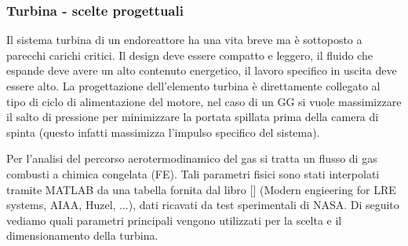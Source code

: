 \subsubsection{Turbina - scelte progettuali}

Il sistema turbina di un endoreattore ha una vita breve ma è sottoposto a parecchi carichi critici. Il design deve essere compatto e leggero, il fluido che espande deve avere un alto contenuto energetico, il lavoro specifico in uscita deve essere alto. La progettazione dell'elemento turbina è direttamente collegato al tipo di ciclo di alimentazione del motore, nel caso di un GG si vuole massimizzare il salto di pressione per minimizzare la portata spillata prima della camera di spinta (questo infatti massimizza l'impulso specifico del sistema). 

Per l'analisi del percorso aerotermodinamico del gas si tratta un flusso di gas combusti a chimica congelata (FE). Tali parametri fisici sono stati interpolati tramite MATLAB da una tabella fornita dal libro [] (Modern engieering for LRE systems, AIAA, Huzel, ...), dati ricavati da test sperimentali di NASA. Di seguito vediamo quali parametri principali vengono utilizzati per la scelta e il dimensionamento della turbina. 

